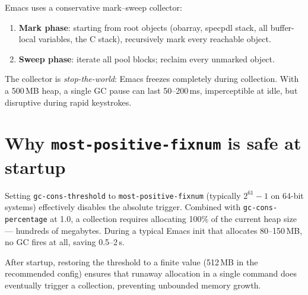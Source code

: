 Emacs uses a conservative mark--sweep collector:

\begin{enumerate}
  \item \textbf{Mark phase}: starting from root objects (obarray,
    specpdl stack, all buffer-local variables, the C stack), recursively
    mark every reachable object.
  \item \textbf{Sweep phase}: iterate all pool blocks; reclaim every
    unmarked object.
\end{enumerate}

The collector is \emph{stop-the-world}: Emacs freezes completely
during collection.  With a 500\,MB heap, a single GC pause can
last 50--200\,ms, imperceptible at idle, but disruptive during
rapid keystrokes.

\section{Why \texttt{most-positive-fixnum} is safe at startup}

Setting \texttt{gc-cons-threshold} to \texttt{most-positive-fixnum}
(typically $2^{61}-1$ on 64-bit systems) effectively disables the
absolute trigger.  Combined with \texttt{gc-cons-percentage} at 1.0,
a collection requires allocating 100\% of the current heap size---
hundreds of megabytes.  During a typical Emacs init that allocates
80--150\,MB, no GC fires at all, saving 0.5--2\,s.

After startup, restoring the threshold to a finite value (512\,MB in
the recommended config) ensures that runaway allocation in a single
command does eventually trigger a collection, preventing unbounded
memory growth.
